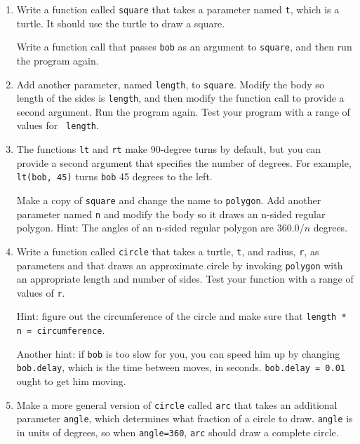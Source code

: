 \documentclass[10pt]{book}
\begin{document}
\begin{enumerate}

\item Write a function called {\tt square} that takes a parameter
named {\tt t}, which is a turtle.  It should use the turtle to draw
a square.

Write a function call that passes {\tt bob} as an argument to
{\tt square}, and then run the program again.

\item Add another parameter, named {\tt length}, to {\tt square}.
Modify the body so length of the sides is {\tt length}, and then
modify the function call to provide a second argument.  Run the
program again.  Test your program with a range of values for {\tt
length}.

\item The functions {\tt lt} and {\tt rt} make 90-degree turns by
default, but you can provide a second argument that specifies the
number of degrees.  For example, {\tt lt(bob, 45)} turns {\tt bob} 45
degrees to the left.

Make a copy of {\tt square} and change the name to {\tt polygon}.  Add
another parameter named {\tt n} and modify the body so it draws an
n-sided regular polygon.  Hint: The angles of an n-sided regular
polygon are $360.0 / n$ degrees.


\item Write a function called {\tt circle} that takes a turtle, {\tt t},
and radius, {\tt r}, as parameters and that draws an approximate circle
by invoking {\tt polygon} with an appropriate length and number of
sides.  Test your function with a range of values of {\tt r}.


Hint: figure out the circumference of the circle and make sure that
{\tt length * n = circumference}.

Another hint: if {\tt bob} is too slow for you, you can speed
him up by changing {\tt bob.delay}, which is the time between moves,
in seconds.  {\tt bob.delay = 0.01} ought to get him moving.

\item Make a more general version of {\tt circle} called {\tt arc}
that takes an additional parameter {\tt angle}, which determines
what fraction of a circle to draw.  {\tt angle} is in units of
degrees, so when {\tt angle=360}, {\tt arc} should draw a complete
circle.


\end{enumerate}
\end{document}
